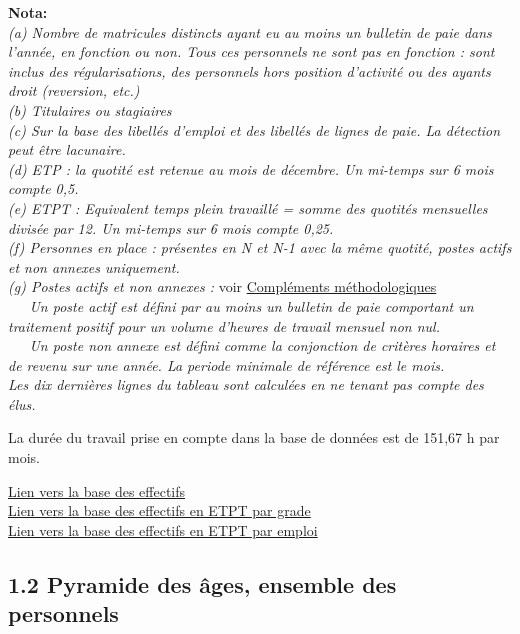 \textbf{Nota:}\\
\emph{(a) Nombre de matricules distincts ayant eu au moins un bulletin
de paie dans l'année, en fonction ou non. Tous ces personnels ne sont
pas en fonction : sont inclus des régularisations, des personnels hors
position d'activité ou des ayants droit (reversion, etc.)}\\
\emph{(b) Titulaires ou stagiaires}\\
\emph{(c) Sur la base des libellés d'emploi et des libellés de lignes de
paie. La détection peut être lacunaire.}\\
\emph{(d) ETP : la quotité est retenue au mois de décembre. Un mi-temps
sur 6 mois compte 0,5.}\\
\emph{(e) ETPT : Equivalent temps plein travaillé = somme des quotités
mensuelles divisée par 12. Un mi-temps sur 6 mois compte 0,25.}\\
\emph{(f) Personnes en place : présentes en N et N-1 avec la même
quotité, postes actifs et non annexes uniquement.}\\
\emph{(g) Postes actifs et non annexes :} voir
\href{../Docs/méthodologie.pdf}{Compléments méthodologiques}\\
\emph{~~~Un poste actif est défini par au moins un bulletin de paie
comportant un traitement positif pour un volume d'heures de travail
mensuel non nul.}\\
\emph{~~~Un poste non annexe est défini comme la conjonction de critères
horaires et de revenu sur une année. La periode minimale de référence
est le mois.}\\
\emph{Les dix dernières lignes du tableau sont calculées en ne tenant
pas compte des élus.}

La durée du travail prise en compte dans la base de données est de
151,67 h par mois.

\href{../Bases/Effectifs/tableau.effectifs.csv}{Lien vers la base des
effectifs}\\
\href{../Bases/Effectifs/tableau.effectifs.grades.csv}{Lien vers la base
des effectifs en ETPT par grade}\\
\href{../Bases/Effectifs/tableau.effectifs.emplois.csv}{Lien vers la base
des effectifs en ETPT par emploi}

\hypertarget{pyramide-des-ages-ensemble-des-personnels}{%
\subsection{1.2 Pyramide des âges, ensemble des
personnels}\label{pyramide-des-ages-ensemble-des-personnels}}

